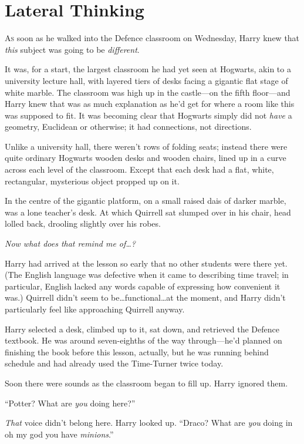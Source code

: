 \chapter{Lateral Thinking}

\lettrine{A}{s} soon as he walked into the Defence classroom on Wednesday, Harry knew that \emph{this} subject was going to be \emph{different}.

It was, for a start, the largest classroom he had yet seen at Hogwarts, akin to a university lecture hall, with layered tiers of desks facing a gigantic flat stage of white marble. The classroom was high up in the castle—on the fifth floor—and Harry knew that was as much explanation as he’d get for where a room like this was supposed to fit. It was becoming clear that Hogwarts simply did not \emph{have} a geometry, Euclidean or otherwise; it had connections, not directions.

Unlike a university hall, there weren’t rows of folding seats; instead there were quite ordinary Hogwarts wooden desks and wooden chairs, lined up in a curve across each level of the classroom. Except that each desk had a flat, white, rectangular, mysterious object propped up on it.

In the centre of the gigantic platform, on a small raised dais of darker marble, was a lone teacher’s desk. At which Quirrell sat slumped over in his chair, head lolled back, drooling slightly over his robes.

\emph{Now what does that remind me of…?}

Harry had arrived at the lesson so early that no other students were there yet. (The English language was defective when it came to describing time travel; in particular, English lacked any words capable of expressing how convenient it was.) Quirrell didn’t seem to be…functional…at the moment, and Harry didn’t particularly feel like approaching Quirrell anyway.

Harry selected a desk, climbed up to it, sat down, and retrieved the Defence textbook. He was around seven-eighths of the way through—he’d planned on finishing the book before this lesson, actually, but he was running behind schedule and had already used the Time-Turner twice today.

Soon there were sounds as the classroom began to fill up. Harry ignored them.

“Potter? What are \emph{you} doing here?”

\emph{That} voice didn’t belong here. Harry looked up. “Draco? What are \emph{you} doing in oh my god you have \emph{minions}.”

